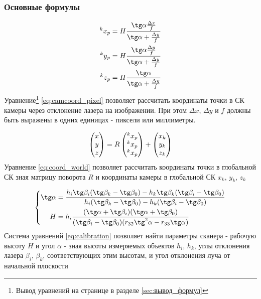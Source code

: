 \documentclass[a4paper, 12pt]{article}
\begin{document}
			\subsubsection{Основные формулы}
				\begin{equation}\label{eq:camcoord_pixel}
					\begin{aligned}
						\prescript{k}{}{x}_p = H\frac{\tg\alpha\frac{\Delta x}{f}}{\tg\alpha+\frac{\Delta y}{f}}\\
						\prescript{k}{}{y}_p = H\frac{\tg\alpha\frac{\Delta y}{f}}{\tg\alpha+\frac{\Delta y}{f}}\\
						\prescript{k}{}{z}_p = H\frac{\tg\alpha}{\tg\alpha+\frac{\Delta y}{f}}
					\end{aligned}
				\end{equation}
				Уравнение\footnote{Вывод уравнений на странице \pageref{sec:вывод_формул} в разделе \ref{sec:вывод_формул}} \eqref{eq:camcoord_pixel} позволяет рассчитать координаты точки в СК камеры через отклонение лазера на изображении.
				При этом $\Delta x$, $\Delta y$ и $f$ должны быть выражены в одних единицах - пиксели или миллиметры.
				
				\begin{equation}\label{eq:coord_world}
					\begin{pmatrix}
						x\\y\\z
					\end{pmatrix}
					=
					R
					\begin{pmatrix}
						\prescript{k}{}{x}_p\\
						\prescript{k}{}{x}_p\\
						\prescript{k}{}{x}_p
					\end{pmatrix}
					+
					\begin{pmatrix}
						x_k\\y_k\\z_k
					\end{pmatrix}
				\end{equation}
				Уравнение \eqref{eq:coord_world} позволяет рассчитать координаты точки в глобальной СК зная матрицу поворота $R$ и координаты камеры в глобальной СК $x_k,\,y_k,\,z_k$
				
				\begin{equation}\label{eq:calibration}
					\left\{
						\begin{aligned}
							\tg\alpha &= \frac{h_i\tg\beta_i(\tg\beta_k-\tg\beta_0) - h_k\tg\beta_k(\tg\beta_i-\tg\beta_0)}{h_i(\tg\beta_k-\tg\beta_0) - h_k(\tg\beta_i-\tg\beta_0)}\\
							H &= h_i\frac{(\tg\alpha + \tg\beta_i)(\tg\alpha + \tg\beta_0)}{(\tg\beta_i - \tg\beta_0)(r_{32}\tg^2\alpha-r_{33}\tg\alpha)}
						\end{aligned}
					\right.
				\end{equation}
				Система уравнений \eqref{eq:calibration} позволяет найти параметры сканера - рабочую высоту $H$ и угол $\alpha$ - зная высоты измеряемых объектов $h_i,\,h_k$, углы отклонения лазера $\beta_i,\,\beta_k$, соответствующих этим высотам, и угол отклонения луча от начальной плоскости
\end{document}
